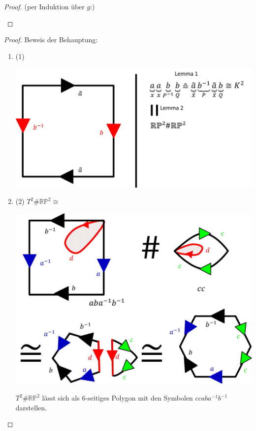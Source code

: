 \documentclass[a4paper,11pt,notitlepage]{report}
\theoremstyle{definition}
\newcommand{\R}{{\ensuremath{\mathbb{R}}}}
\newcommand{\Prim}{{\ensuremath{\mathbb{P}}}}
\begin{document}
\begin{proof}{(per Induktion über $g$:)}
\begin{itemize}
\begin{center}
	\end{center}
	\end{itemize}
\end{proof}

\newpage 

\begin{proof}{Beweis der Behauptung:}
	\begin{enumerate}
		\item (1) \begin{center}
		\includegraphics[scale=0.3]{images/2012_01_30_Bild5.jpg}
	\end{center}
		\item (2)
		$T^2 \# \R \Prim^2 \cong $
		\begin{center}
		\includegraphics[scale=0.3]{images/2012_01_30_Bild6.jpg}
	\end{center}
		$T^2 \# \R \Prim^2$ lässt sich als 6-seitiges Polygon mit den Symbolen $ccaba^{-1}b^{-1}$ darstellen.
		

\end{enumerate}
\end{proof}
\end{document}
